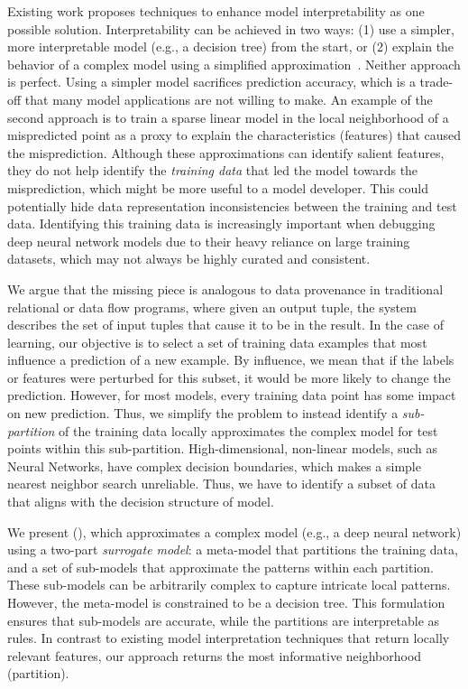 Existing work proposes techniques to enhance model interpretability as one possible solution.
Interpretability can be achieved in two ways: (1) use a simpler, more interpretable model (e.g., a decision tree) from the start, or (2) explain the behavior of a complex model using a simplified approximation~\cite{taylor2016alignment, lei2016rationalizing, ribeiro2016should}. Neither approach is perfect. 
Using a simpler model sacrifices prediction accuracy, which is a trade-off that many model applications are not willing to make.
An example of the second approach is to train a sparse linear model in the local neighborhood of a mispredicted point as a proxy to explain the characteristics (features) that caused the misprediction\cite{taylor2016alignment, lei2016rationalizing, ribeiro2016should}.
Although these approximations can identify salient features, they do not help identify the {\it training data} that led the model towards the misprediction, which might be more useful to a model developer.
This could potentially hide data representation inconsistencies between the training and test data.
Identifying this training data is increasingly important when debugging deep neural network models due to their heavy reliance on large training datasets, which may not always be highly curated and consistent.

We argue that the missing piece is analogous to data provenance in traditional relational or data flow programs, where given an output tuple, the system describes the set of input tuples that cause it to be in the result.
In the case of learning, our objective is to select a set of training data examples that most influence a prediction of a new example.
By influence, we mean that if the labels or features were perturbed for this subset, it would be more likely to change the prediction.
However, for most models, every training data point has some impact on new prediction.
Thus, we simplify the problem to instead identify a {\it sub-partition} of the training data locally approximates the complex model for test points within this sub-partition.  
High-dimensional, non-linear models, such as Neural Networks, have complex decision boundaries, which makes a simple nearest neighbor search unreliable.
Thus, we have to identify a subset of data that aligns with the decision structure of model.

We present \sysfull (\sys), which approximates a complex model (e.g., a deep neural network) using a two-part {\it surrogate model}: a meta-model that partitions the training data, and a set of sub-models that approximate the patterns within each partition.
These sub-models can be arbitrarily complex to capture intricate local patterns. However, the meta-model is constrained to be a decision tree.
This formulation ensures that sub-models are accurate, while the partitions are interpretable as rules.
In contrast to existing model interpretation techniques that return locally relevant features, our approach returns the most informative neighborhood (partition).

